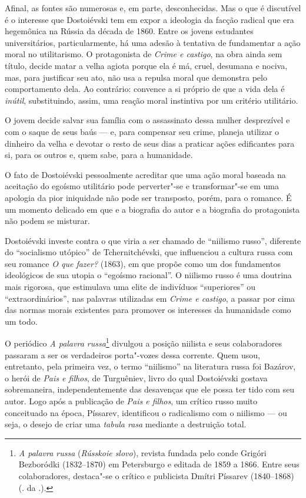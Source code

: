 Afinal, as fontes são numerosas e, em parte, desconhecidas. Mas o que é
discutível é o interesse que Dostoiévski tem em expor a ideologia da
facção radical que era hegemônica na Rússia da década de 1860. Entre os
jovens estudantes universitários, particularmente, há uma adesão à
tentativa de fundamentar a ação moral no utilitarismo. O protagonista de
\emph{Crime e castigo}, na obra ainda sem título, decide matar a velha
agiota porque ela é má, cruel, desumana e nociva, mas, para justificar
seu ato, não usa a repulsa moral que demonstra pelo comportamento dela.
Ao contrário: convence a si próprio de que a vida dela é \emph{inútil},
substituindo, assim, uma reação moral instintiva por um critério
utilitário.

O jovem decide salvar sua família com o assassinato dessa mulher
desprezível e com o saque de seus baús --- e, para compensar seu crime,
planeja utilizar o dinheiro da velha e devotar o resto de seus dias a
praticar ações edificantes para si, para os outros e, quem sabe, para a
humanidade.

O fato de Dostoiévski pessoalmente acreditar que uma ação moral baseada
na aceitação do egoísmo utilitário pode perverter"-se e transformar"-se em
uma apologia da pior iniquidade não pode ser transposto, porém, para o
romance. É um momento delicado em que e a biografia do autor e a
biografia do protagonista não podem se misturar.

Dostoiévski investe contra o que viria a ser chamado de ``niilismo
russo'', diferente do ``socialismo utópico'' de Tchernitchévski, que
influenciou a cultura russa com seu romance \emph{O que fazer?} (1863),
em que propõe como um dos fundamentos ideológicos de sua utopia o
``egoísmo racional''. O niilismo russo é uma doutrina mais rigorosa, que
estimulava uma elite de indivíduos ``superiores'' ou
``extraordinários'', nas palavras utilizadas em \emph{Crime e castigo},
a passar por cima das normas morais existentes para promover os
interesses da humanidade como um todo.

O periódico \emph{A palavra russa}\footnote{\emph{A palavra russa}
  (\emph{Rússkoie slovo}), revista fundada pelo conde Grigóri Bezboródki
  (1832--1870) em Petersburgo e editada de 1859 a 1866. Entre seus
  colaboradores, destaca"-se o crítico e publicista Dmítri Píssarev
  (1840--1868) (. da .).} divulgou a posição niilista e seus
colaboradores passaram a ser os verdadeiros porta"-vozes dessa corrente.
Quem usou, entretanto, pela primeira vez, o termo ``niilismo'' na
literatura russa foi Bazárov, o herói de \emph{Pais e filhos}, de
Turguêniev, livro do qual Dostoiévski gostava sobremaneira,
independentemente das desavenças que ele possa ter tido com seu autor.
Logo após a publicação de \emph{Pais e filhos}, um crítico russo muito
conceituado na época, Píssarev, identificou o radicalismo com o niilismo
--- ou seja, o desejo de criar uma \emph{tabula rasa} mediante a
destruição total.

